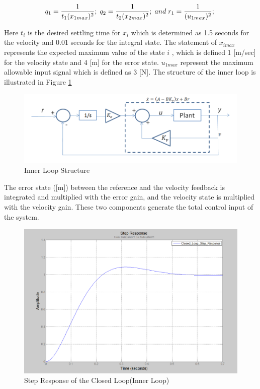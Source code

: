 \begin{equation}
q_1 = \frac{1}{t_1 (x_{1max})^2}; \hspace{0.1cm}
q_2 = \frac{1}{t_2 (x_{2max})^2}; \hspace{0.1cm} and \hspace{0.1cm}
r_1 = \frac{1}{ (u_{1max})^2}; \hspace{0.1cm}
\end{equation}

Here $t_i$  is the desired settling time for $x_i$ which is determined as 1.5 seconds for the velocity and 0.01 seconds for the integral state. The statement of $x_{imax}$ represents the expected maximum value of the state $i$ , which is defined 1 [m/sec] for the velocity state and 4 [m] for the error state. $u_{1max}$ represent the maximum allowable input signal which is defined as 3 [N]. The structure of the inner loop is illustrated in Figure \ref{innerloopref}

\begin{figure}[H]
\caption{Inner Loop Structure} \label{innerloopref}
\centering
\includegraphics[scale = 0.50]{inner_loop}
\end{figure}

The error state ([m]) between the reference and the velocity feedback is integrated and multiplied with the error gain, and the velocity state is multiplied with the velocity gain. These two components generate the total control input of the system.  

\begin{figure}[H]
\caption{Step Response of the Closed Loop(Inner Loop)} \label{Stepresp}
\centering
\includegraphics[scale = 0.40]{step_resp}
\end{figure}

